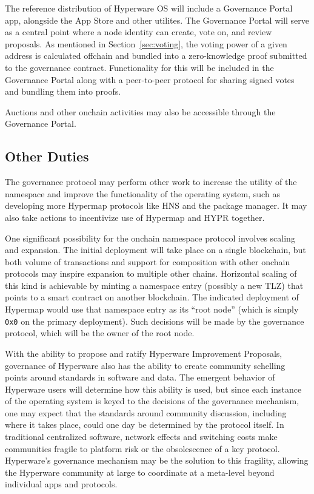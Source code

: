 \documentclass[runningheads]{llncs}
\begin{document}
The reference distribution of Hyperware OS will include a Governance Portal app, alongside the App Store and other utilites.
The Governance Portal will serve as a central point where a node identity can create, vote on, and review proposals.
As mentioned in Section~\ref{sec:voting}, the voting power of a given address is calculated offchain and bundled into a zero-knowledge proof submitted to the governance contract.
Functionality for this will be included in the Governance Portal along with a peer-to-peer protocol for sharing signed votes and bundling them into proofs.

Auctions and other onchain activities may also be accessible through the Governance Portal.

\subsection{Other Duties}
\label{sec:govduties}

The governance protocol may perform other work to increase the utility of the namespace and improve the functionality of the operating system, such as developing more Hypermap protocols like HNS and the package manager.
It may also take actions to incentivize use of Hypermap and HYPR together.

One significant possibility for the onchain namespace protocol involves scaling and expansion.
The initial deployment will take place on a single blockchain, but both volume of transactions and support for composition with other onchain protocols may inspire expansion to multiple other chains.
Horizontal scaling of this kind is achievable by minting a namespace entry (possibly a new TLZ) that points to a smart contract on another blockchain.
The indicated deployment of Hypermap would use that namespace entry as its ``root node'' (which is simply \verb|0x0| on the primary deployment).
Such decisions will be made by the governance protocol, which will be the owner of the root node.

With the ability to propose and ratify Hyperware Improvement Proposals, governance of Hyperware also has the ability to create community schelling points around standards in software and data.
The emergent behavior of Hyperware users will determine how this ability is used, but since each instance of the operating system is keyed to the decisions of the governance mechanism, one may expect that the standards around community discussion, including where it takes place, could one day be determined by the protocol itself.
In traditional centralized software, network effects and switching costs make communities fragile to platform risk or the obsolescence of a key protocol.
Hyperware's governance mechanism may be the solution to this fragility, allowing the Hyperware community at large to coordinate at a meta-level beyond individual apps and protocols.
\end{document}
